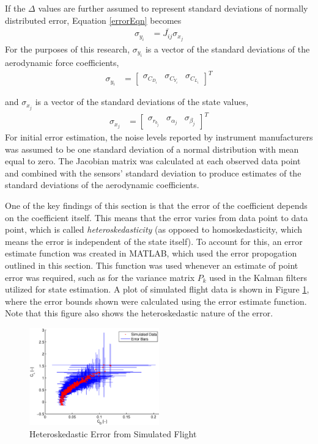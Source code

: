 If the $\Delta$ values are further assumed to represent standard deviations of normally distributed error, Equation \ref{errorEqn} becomes
\begin{align}
\sigma_{y_i} &= \bar{J_{ij}} \sigma_{x_j}
\end{align}
For the purposes of this research, $\sigma_{y_i}$ is a vector of the standard deviations of the aerodynamic force coefficients,
\begin{align}
\sigma_{y_i} &= \begin{bmatrix} \sigma_{C_{D_i}} & \sigma_{C_{Y_i}} & \sigma_{C_{L_i}} \end{bmatrix}^T
\end{align}

and $\sigma_{x_j}$ is a vector of the standard deviations of the state values,
\begin{align}
\sigma_{x_j} &= \begin{bmatrix} \sigma_{r_{b_j}} & \sigma_{\alpha_j} & \sigma_{\beta_j}\end{bmatrix}^T
\end{align}
For initial error estimation, the noise levels reported by instrument manufacturers was assumed to be one standard deviation of a normal distribution with mean equal to zero. The Jacobian matrix was calculated at each observed data point and combined with the sensors' standard deviation to produce estimates of the standard deviations of the aerodynamic coefficients.

One of the key findings of this section is that the error of the coefficient depends on the coefficient itself. This means that the error varies from data point to data point, which is called \textit{heteroskedasticity} (as opposed to homoskedasticity, which means the error is independent of the state itself). To account for this, an error estimate function was created in MATLAB, which used the error propogation outlined in this section. This function was used whenever an estimate of point error was required, such as for the variance matrix $P_k$ used in the Kalman filters utilized for state estimation. A plot of simulated flight data is shown in Figure \ref{errorBndFigure}, where the error bounds shown were calculated using the error estimate function. Note that this figure also shows the heteroskedastic nature of the error.

\begin{figure}[H]
 \label{errorBndFigure}
  \centering
    \includegraphics[width=0.5\textwidth]{figures/heteroskedasticity.eps}
      \caption{Heteroskedastic Error from Simulated Flight}
\end{figure}


